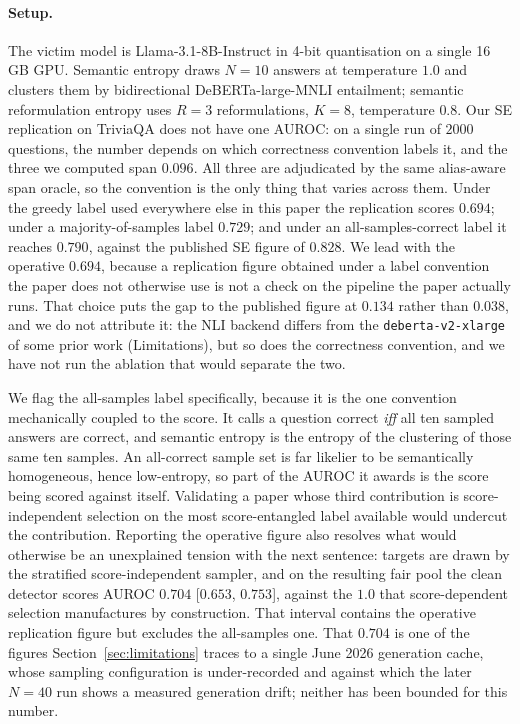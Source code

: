 \paragraph{Setup.}
The victim model is Llama-3.1-8B-Instruct in 4-bit quantisation on a single 16\,GB GPU.
Semantic entropy draws $N{=}10$ answers at temperature $1.0$ and clusters them by
bidirectional DeBERTa-large-MNLI entailment; semantic reformulation entropy uses
$R{=}3$ reformulations, $K{=}8$, temperature $0.8$. Our SE replication on TriviaQA does not
have one AUROC: on a single run of $2000$ questions, the number depends on which correctness
convention labels it, and the three we computed span $0.096$. All three are adjudicated by
the same alias-aware span oracle, so the convention is the only thing that varies across
them. Under the greedy label used everywhere else in this paper the replication scores
$0.694$; under a majority-of-samples label $0.729$; and under an all-samples-correct label
it reaches $0.790$,
against the published SE figure of $0.828$. We lead with the operative $0.694$, because a
replication figure obtained under a
label convention the paper does not otherwise use is not a check on the pipeline the paper
actually runs. That choice puts the gap to the published figure at $0.134$ rather than
$0.038$, and we do not attribute it: the NLI backend differs from the
\texttt{deberta-v2-xlarge} of some prior work (Limitations), but so does the correctness
convention, and we have not run the ablation that would separate the two.

We flag the all-samples label specifically, because it is the one convention mechanically
coupled to the score. It calls a question correct \emph{iff} all ten sampled answers are
correct, and semantic entropy is the entropy of the clustering of those same ten samples. An
all-correct sample set is far likelier to be semantically homogeneous, hence low-entropy, so
part of the AUROC it awards is the score being scored against itself. Validating a paper
whose third contribution is score-independent selection on the most score-entangled label
available would undercut the contribution. Reporting the operative figure also resolves what
would otherwise be an unexplained tension with the next sentence: targets are drawn by the
stratified score-independent sampler, and on the resulting fair pool the clean detector
scores AUROC $0.704$ [$0.653$, $0.753$], against the $1.0$ that score-dependent selection
manufactures by construction. That interval contains the operative replication figure
but excludes the all-samples one. That $0.704$ is one of the figures
Section~\ref{sec:limitations} traces to a single June 2026 generation cache, whose
sampling configuration is under-recorded and against which the later $N{=}40$ run shows a
measured generation drift; neither has been bounded for this number.

